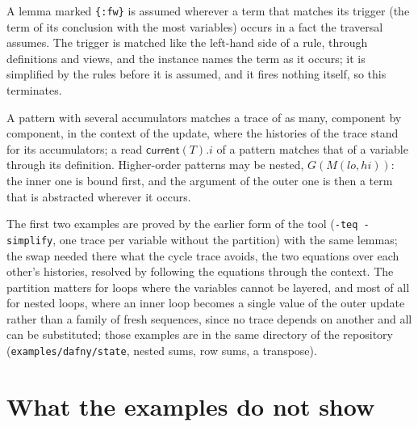 \documentclass[11pt,a4paper]{article}
\newcommand{\cur}{\mathsf{current}}
\begin{document}
\begin{description}[leftmargin=1.5em]
\item[Forward facts.] A lemma marked \lstinline|{:fw}| is assumed wherever a term that matches its trigger (the term
  of its conclusion with the most variables) occurs in a fact the traversal assumes. The trigger is matched like
  the left-hand side of a rule, through definitions and views, and the instance names the term as it occurs; it is
  simplified by the rules before it is assumed, and it fires nothing itself, so this terminates.
\item[Cycles as a whole.] A pattern with several accumulators matches a trace of as many, component by component,
  in the context of the update, where the histories of the trace stand for its accumulators; a read $\cur(T).i$ of
  a pattern matches that of a variable through its definition. Higher-order patterns may be nested, $G(M(lo, hi))$:
  the inner one is bound first, and the argument of the outer one is then a term that is abstracted wherever it
  occurs.
\end{description}

The first two examples are proved by the earlier form of the tool (\texttt{-teq -simplify}, one trace per variable
without the partition) with the same lemmas; the swap needed there what the cycle trace avoids, the two equations
over each other's histories, resolved by following the equations through the context. The partition matters for
loops where the variables cannot be layered, and most of all for nested loops, where an inner loop becomes a single
value of the outer update rather than a family of fresh sequences, since no trace depends on another and all can be
substituted; those examples are in the same directory of the repository (\texttt{examples/dafny/state}, nested sums,
row sums, a transpose).

\section{What the examples do not show}
\end{document}
